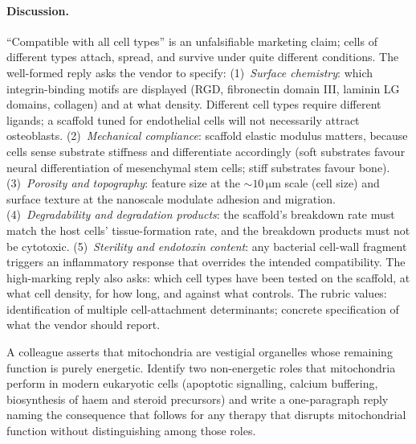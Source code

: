 \paragraph{Discussion.}
``Compatible with all cell types'' is an unfalsifiable marketing
claim; cells of different types attach, spread, and survive under
quite different conditions. The well-formed reply asks the vendor to
specify:
(1)~\emph{Surface chemistry}: which integrin-binding motifs are
displayed (RGD, fibronectin domain III, laminin LG domains, collagen)
and at what density. Different cell types require different ligands;
a scaffold tuned for endothelial cells will not necessarily attract
osteoblasts.
(2)~\emph{Mechanical compliance}: scaffold elastic modulus matters,
because cells sense substrate stiffness and differentiate accordingly
(soft substrates favour neural differentiation of mesenchymal stem
cells; stiff substrates favour bone).
(3)~\emph{Porosity and topography}: feature size at the
$\sim 10\,\si{\micro\meter}$ scale (cell size) and surface texture
at the nanoscale modulate adhesion and migration.
(4)~\emph{Degradability and degradation products}: the scaffold's
breakdown rate must match the host cells' tissue-formation rate, and
the breakdown products must not be cytotoxic.
(5)~\emph{Sterility and endotoxin content}: any bacterial cell-wall
fragment triggers an inflammatory response that overrides the
intended compatibility. The high-marking reply also asks: which cell
types have been tested on the scaffold, at what cell density, for
how long, and against what controls. The rubric values: identification
of multiple cell-attachment determinants; concrete specification of
what the vendor should report.

\begin{exercise}
A colleague asserts that mitochondria are vestigial organelles whose
remaining function is purely energetic. Identify two non-energetic
roles that mitochondria perform in modern eukaryotic cells (apoptotic
signalling, calcium buffering, biosynthesis of haem and steroid
precursors) and write a one-paragraph reply naming the consequence
that follows for any therapy that disrupts mitochondrial function
without distinguishing among those roles.
\end{exercise}

